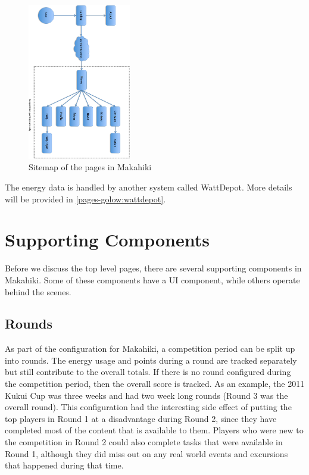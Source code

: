 \begin{figure}[h]
  \center
  \includegraphics[width=0.4\textwidth, angle=90]{images/sitemap.eps}
  \caption{Sitemap of the pages in Makahiki}
  \label{fig:sitemap}
\end{figure}

The energy data is handled by another system called WattDepot. More details will be provided in \autoref{pages-golow:wattdepot}.

\section{Supporting Components}
\label{makahiki:components}

Before we discuss the top level pages, there are several supporting components in Makahiki. Some of these components have a UI component, while others operate behind the scenes.

\subsection{Rounds}

As part of the configuration for Makahiki, a competition period can be split up into rounds. The energy usage and points during a round are tracked separately but still contribute to the overall totals. If there is no round configured during the competition period, then the overall score is tracked. As an example, the 2011 Kukui Cup was three weeks and had two week long rounds (Round 3 was the overall round). This configuration had the interesting side effect of putting the top players in Round 1 at a disadvantage during Round 2, since they have completed most of the content that is available to them. Players who were new to the competition in Round 2 could also complete tasks that were available in Round 1, although they did miss out on any real world events and excursions that happened during that time.

